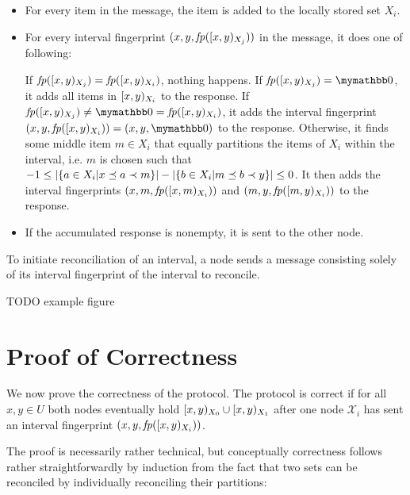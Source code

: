 \begin{itemize}
  \item For every item in the message, the item is added to the locally stored set $X_i$.
  \item For every interval fingerprint $({x}, {y}, {\mathit{fp}([{x},{y})_{X_j})})$ in the message, it does one of following:
    \begin{caselist}
       \label{def-fingerprint-eq}  If $\mathit{fp}([{x},{y})_{X_j}) = \mathit{fp}([{x},{y})_{X_i})$, nothing happens.
       If $\fp{\interval{x}{y}{X_j}} = \neutraladd$, it adds all items in $[{x},{y})_{X_i}$ to the response.
       \label{def-x1-empty} If $\fp{\interval{x}{y}{X_j}} \neq \neutraladd = \fp{\interval{x}{y}{X_i}}$, it adds the interval fingerprint $\ifp{x}{y}{X_i} = \ifpmanual{x}{y}{\neutraladd}$ to the response.
      \case[Recursive] \label{def-recursive} Otherwise, it finds some middle item $m \in X_i$ that equally partitions the items of $X_i$ within the interval, i.e. $m$ is chosen such that $-1 \leq |{\{a \in X_i | x \preceq a \prec m\}}| - |{\{b \in X_i | m \preceq b \prec y\}}| \leq 0$. It then adds the interval fingerprints $({x}, {m}, {\mathit{fp}([{x},{m})_{X_i})})$ and $({m}, {y}, {\mathit{fp}([{m},{y})_{X_i})})$ to the response.
    \end{caselist}
  \item If the accumulated response is nonempty, it is sent to the other node.
\end{itemize}

To initiate reconciliation of an interval, a node sends a message consisting solely of its interval fingerprint of the interval to reconcile.

TODO example figure

\section{Proof of Correctness}
\label{set-reconciliation-simple-correct}

We now prove the correctness of the protocol. The protocol is correct if for all $x, y \in U$ both nodes eventually hold $[{x},{y})_{X_0} \cup [{x},{y})_{X_1}$ after one node $\mathcal{X}_i$ has sent an interval fingerprint $({x}, {y}, {\mathit{fp}([{x},{y})_{X_i})})$.

The proof is necessarily rather technical, but conceptually correctness follows rather straightforwardly by induction from the fact that two sets can be reconciled by individually reconciling their partitions:

